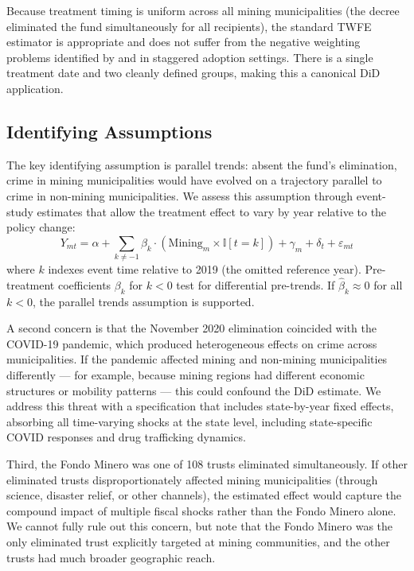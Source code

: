 \documentclass[12pt]{article}
\newcommand{\ind}{\mathbb{I}}
\begin{document}
Because treatment timing is uniform across all mining municipalities (the decree eliminated the fund simultaneously for all recipients), the standard TWFE estimator is appropriate and does not suffer from the negative weighting problems identified by \citet{callaway2021did} and \citet{roth2023whats} in staggered adoption settings. There is a single treatment date and two cleanly defined groups, making this a canonical DiD application.

\subsection{Identifying Assumptions}

The key identifying assumption is parallel trends: absent the fund's elimination, crime in mining municipalities would have evolved on a trajectory parallel to crime in non-mining municipalities. We assess this assumption through event-study estimates that allow the treatment effect to vary by year relative to the policy change:
\begin{equation}
\label{eq:event}
Y_{mt} = \alpha + \sum_{k \neq -1} \beta_k \cdot (\text{Mining}_m \times \ind[t = k]) + \gamma_m + \delta_t + \varepsilon_{mt}
\end{equation}
where $k$ indexes event time relative to 2019 (the omitted reference year). Pre-treatment coefficients $\beta_k$ for $k < 0$ test for differential pre-trends. If $\hat{\beta}_k \approx 0$ for all $k < 0$, the parallel trends assumption is supported.

A second concern is that the November 2020 elimination coincided with the COVID-19 pandemic, which produced heterogeneous effects on crime across municipalities. If the pandemic affected mining and non-mining municipalities differently --- for example, because mining regions had different economic structures or mobility patterns --- this could confound the DiD estimate. We address this threat with a specification that includes state-by-year fixed effects, absorbing all time-varying shocks at the state level, including state-specific COVID responses and drug trafficking dynamics.

Third, the Fondo Minero was one of 108 trusts eliminated simultaneously. If other eliminated trusts disproportionately affected mining municipalities (through science, disaster relief, or other channels), the estimated effect would capture the compound impact of multiple fiscal shocks rather than the Fondo Minero alone. We cannot fully rule out this concern, but note that the Fondo Minero was the only eliminated trust explicitly targeted at mining communities, and the other trusts had much broader geographic reach.
\end{document}
